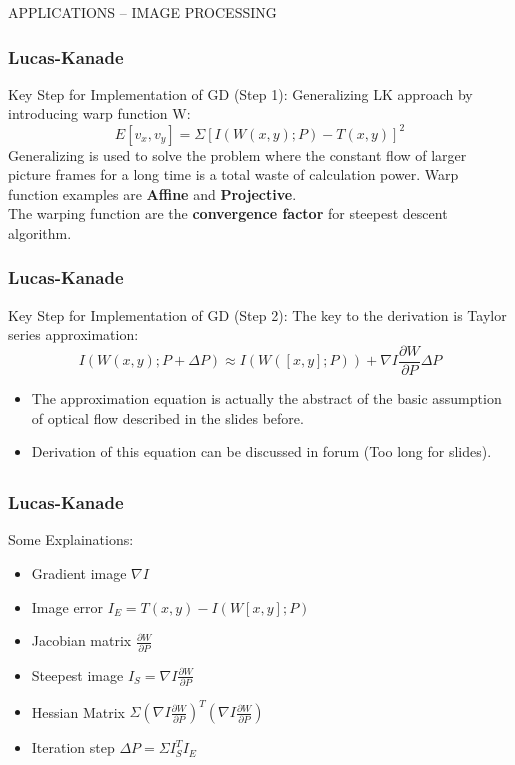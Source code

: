 \begin{frame}{ \LARGE APPLICATIONS -- IMAGE PROCESSING}
\frametitle{Lucas-Kanade}
  \begin{redblock}{Key Step for Implementation of GD (Step 1):}
    Generalizing LK approach by introducing warp function W:
    $$E[v_x, v_y]  = \Sigma [I(W(x, y); P) - T(x,y)]^2$$
    Generalizing is used to solve the problem where the constant flow
    of larger picture frames for a long time is a total waste of
    calculation power. Warp function examples are {\bf Affine}  and
    {\bf Projective}. \\
The warping function are the {\bf convergence factor} for steepest descent
algorithm.
  \end{redblock}
\end{frame}


\begin{frame}
\frametitle{Lucas-Kanade}
  \begin{redblock}{Key Step for Implementation of GD (Step 2):}
The key to the derivation is Taylor series approximation:
$$ I(W(x, y); P + \Delta P) \approx I(W([x, y]; P)) + \nabla I
\frac{\partial W}{\partial P}\Delta P$$
  \end{redblock}

\begin{itemize}
\item The approximation equation is actually the abstract of the basic
assumption of optical flow described in the slides before.
\item Derivation of this equation can be discussed in forum (Too long
  for slides).

\end{itemize}



\subsection{}
\end{frame}

\begin{frame}
\frametitle{Lucas-Kanade}
  \begin{blueblock}{Some Explainations:}
    \begin{itemize}
    \item Gradient image $\nabla I$
    \item Image error $I_E = T(x, y) - I(W[x, y]; P)$
    \item Jacobian matrix $ \frac{\partial W}{\partial P} $
    \item Steepest image  $ I_S =  \nabla I \frac{\partial W}{\partial P}$
    \item Hessian Matrix $\Sigma (\nabla I \frac{\partial W}{\partial
        P})^T(\nabla I \frac{\partial W}{\partial P})$
    \item Iteration step $ \Delta P =  \Sigma I_S^T I_E$
    \end{itemize}

\end{blueblock}

\end{frame}


